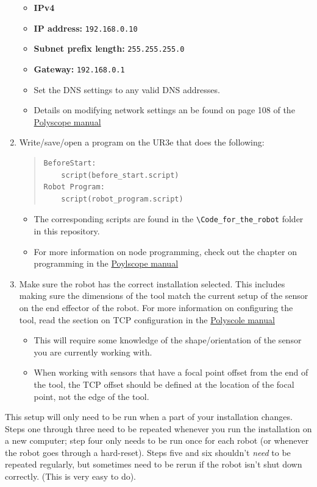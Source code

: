 \documentclass[11pt]{article}
\begin{document}
\begin{enumerate}
    \begin{itemize}
        \item \textbf{IPv4}
        \item \textbf{IP address:} \texttt{192.168.0.10}
        \item \textbf{Subnet prefix length:} \texttt{255.255.255.0}
        \item \textbf{Gateway:} \texttt{192.168.0.1}
        \item Set the DNS settings to any valid DNS addresses.
        \item Details on modifying network settings an be found on page 108 of the \hyperlink{https://s3-eu-west-1.amazonaws.com/ur-support-site/44018/Software_Manual_en_Global.pdf\#page=108}{Polyscope manual}
    \end{itemize}
    \item Write/save/open a program on the UR3e that does the following:
        \begin{quote}
\begin{verbatim}
BeforeStart:
    script(before_start.script)
Robot Program:
    script(robot_program.script)        
\end{verbatim}
        \end{quote}
    \begin{itemize}
        \item The corresponding scripts are found in the \texttt{\textbackslash{}Code\_for\_the\_robot} folder in this repository.
        \item For more information on node programming, check out the chapter on programming in the \hyperlink{https://s3-eu-west-1.amazonaws.com/ur-support-site/44018/Software_Manual_en_Global.pdf\#page=60}{Poylscope manual} 
    \end{itemize}
    \item Make sure the robot has the correct installation selected. This includes making sure the dimensions of the tool match the current setup of the sensor on the end effector of the robot. For more information on configuring the tool, read the section on TCP configuration in the \hyperlink{https://s3-eu-west-1.amazonaws.com/ur-support-site/44018/Software_Manual_en_Global.pdf\#page=73}{Polyscole manual}
    \begin{itemize}
        \item This will require some knowledge of the shape/orientation of the sensor you are currently working with.
        \item When working with sensors that have a focal point offset from the end of the tool, the TCP offset should be defined at the location of the focal point, not the edge of the tool.
    \end{itemize}
\end{enumerate}
This setup will only need to be run when a part of your installation changes. Steps one through three need to be repeated whenever you run the installation on a new computer; step four only needs to be run once for each robot (or whenever the robot goes through a hard-reset).
Steps five and six shouldn't \textit{need} to be repeated regularly, but sometimes need to be rerun if the robot isn't shut down correctly. (This is very easy to do).
\end{document}
